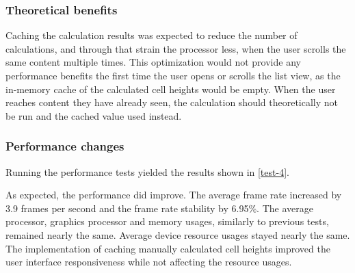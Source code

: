 \documentclass[a4paper,12pt]{article}
\begin{document}
\subsubsection{Theoretical benefits}
Caching the calculation results was expected to reduce the number of calculations, and through that strain the processor less, when the user scrolls the same content multiple times. This optimization would not provide any performance benefits the first time the user opens or scrolls the list view, as the in-memory cache of the calculated cell heights would be empty. When the user reaches content they have already seen, the calculation should theoretically not be run and the cached value used instead.

\subsubsection{Performance changes}
Running the performance tests yielded the results shown in \autoref{test-4}.

As expected, the performance did improve. The average frame rate increased by 3.9 frames per second and the frame rate stability by 6.95\%. The average processor, graphics processor and memory usages, similarly to previous tests, remained nearly the same. Average device resource usages stayed nearly the same. The implementation of caching manually calculated cell heights improved the user interface responsiveness while not affecting the resource usages.
\end{document}

